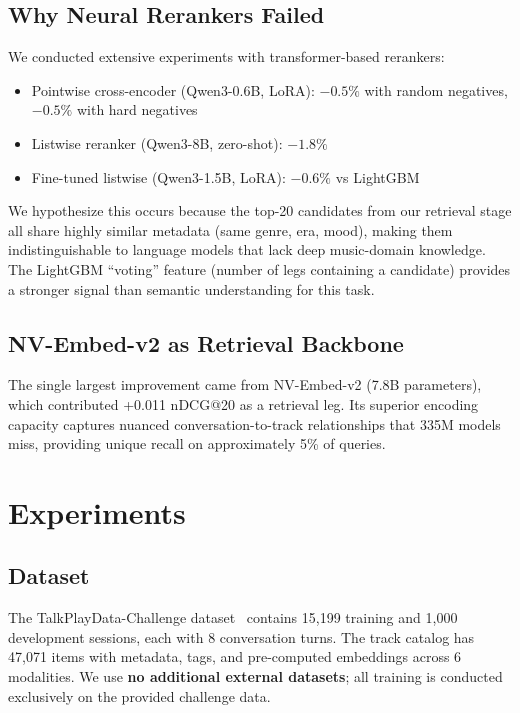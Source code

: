 \documentclass[sigconf]{acmart}
\begin{document}
\subsection{Why Neural Rerankers Failed}

We conducted extensive experiments with transformer-based rerankers:
\begin{itemize}
    \item Pointwise cross-encoder (Qwen3-0.6B, LoRA): $-0.5\%$ with random negatives, $-0.5\%$ with hard negatives
    \item Listwise reranker (Qwen3-8B, zero-shot): $-1.8\%$
    \item Fine-tuned listwise (Qwen3-1.5B, LoRA): $-0.6\%$ vs LightGBM
\end{itemize}

We hypothesize this occurs because the top-20 candidates from our retrieval stage all share highly similar metadata (same genre, era, mood), making them indistinguishable to language models that lack deep music-domain knowledge. The LightGBM ``voting'' feature (number of legs containing a candidate) provides a stronger signal than semantic understanding for this task.

\subsection{NV-Embed-v2 as Retrieval Backbone}

The single largest improvement came from NV-Embed-v2 (7.8B parameters), which contributed +0.011 nDCG@20 as a retrieval leg. Its superior encoding capacity captures nuanced conversation-to-track relationships that 335M models miss, providing unique recall on approximately 5\% of queries.

\section{Experiments}

\subsection{Dataset}

The TalkPlayData-Challenge dataset~\cite{talkplay2026} contains 15,199 training and 1,000 development sessions, each with 8 conversation turns. The track catalog has 47,071 items with metadata, tags, and pre-computed embeddings across 6 modalities. We use \textbf{no additional external datasets}; all training is conducted exclusively on the provided challenge data.
\end{document}
